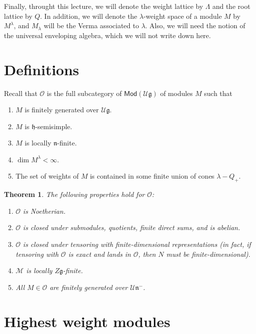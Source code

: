\documentclass[leqno, openany]{memoir}
\newtheorem{thm}{Theorem}[section]
\theoremstyle{definition}
\theoremstyle{remark}
\theoremstyle{plain}
\theoremstyle{definition}
\theoremstyle{remark}
\newcommand{\U}{\mathcal{U}}
\newcommand{\g}{\mathfrak{g}}
\newcommand{\n}{\mathfrak{n}}
\newcommand{\mc}[1]{\mathcal{#1}}
\newcommand{\mf}[1]{\mathfrak{#1}}
\newcommand{\ms}[1]{\mathsf{#1}}
\begin{document}
Finally, throught this lecture, we will denote the weight lattice by $\Lambda$ and the root lattice by $Q$. In addition, we will denote the $\lambda$-weight space of a module $M$ by $M^{\lambda}$, and $M_{\lambda}$ will be the Verma associated to $\lambda$. Also, we will need the notion of the universal enveloping algebra, which we will not write down here.

\section{Definitions}%
\label{sec:definitions}

Recall that $\mc{O}$ is the full subcategory of $\ms{Mod}(\mc{U}\mf{g})$ of modules $M$ such that
\begin{enumerate}
    \item $M$ is finitely generated over $\mc{U}\mf{g}$.
    \item $M$ is $\mf{h}$-semisimple.
    \item $M$ is locally $\mf{n}$-finite.
    \item $\dim M^{\lambda} < \infty$.
    \item The set of weights of $M$ is contained in some finite union of cones $\lambda - Q_+$.
\end{enumerate}

\begin{thm}
    The following properties hold for $\mc{O}$:
    \begin{enumerate}
        \item $\mc{O}$ is Noetherian.
        \item $\mc{O}$ is closed under submodules, quotients, finite direct sums, and is abelian.
        \item $\mc{O}$ is closed under tensoring with finite-dimensional representations (in fact, if tensoring with $\mc{O}$ is exact and lands in $\mc{O}$, then $N$ must be finite-dimensional).
        \item $\mc{M}$ is locally $Z \g$-finite.
        \item All $M \in \mc{O}$ are finitely generated over $\U \n^-$.
    \end{enumerate}
\end{thm}

\section{Highest weight modules}%
\label{sec:highest_weight_modules}
\end{document}
